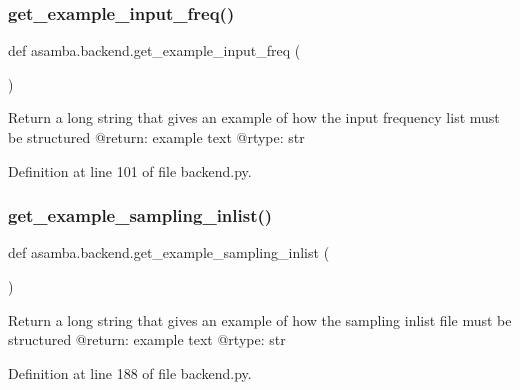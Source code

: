 \subsubsection{\texorpdfstring{get\+\_\+example\+\_\+input\+\_\+freq()}{get\_example\_input\_freq()}}
{\footnotesize\ttfamily def asamba.\+backend.\+get\+\_\+example\+\_\+input\+\_\+freq (\begin{DoxyParamCaption}{ }\end{DoxyParamCaption})}

\begin{DoxyVerb}Return a long string that gives an example of how the input frequency list must be structured
@return: example text
@rtype: str
\end{DoxyVerb}
 

Definition at line 101 of file backend.\+py.

\mbox{\label{namespaceasamba_1_1backend_a29100d2ee6f88a4ca3bf2f7dff20f715}} 
\subsubsection{\texorpdfstring{get\+\_\+example\+\_\+sampling\+\_\+inlist()}{get\_example\_sampling\_inlist()}}
{\footnotesize\ttfamily def asamba.\+backend.\+get\+\_\+example\+\_\+sampling\+\_\+inlist (\begin{DoxyParamCaption}{ }\end{DoxyParamCaption})}

\begin{DoxyVerb}Return a long string that gives an example of how the sampling inlist file must be structured
@return: example text
@rtype: str
\end{DoxyVerb}
 

Definition at line 188 of file backend.\+py.

\mbox{\label{namespaceasamba_1_1backend_a5df45c487576d585748d45f92a587ad9}} 
